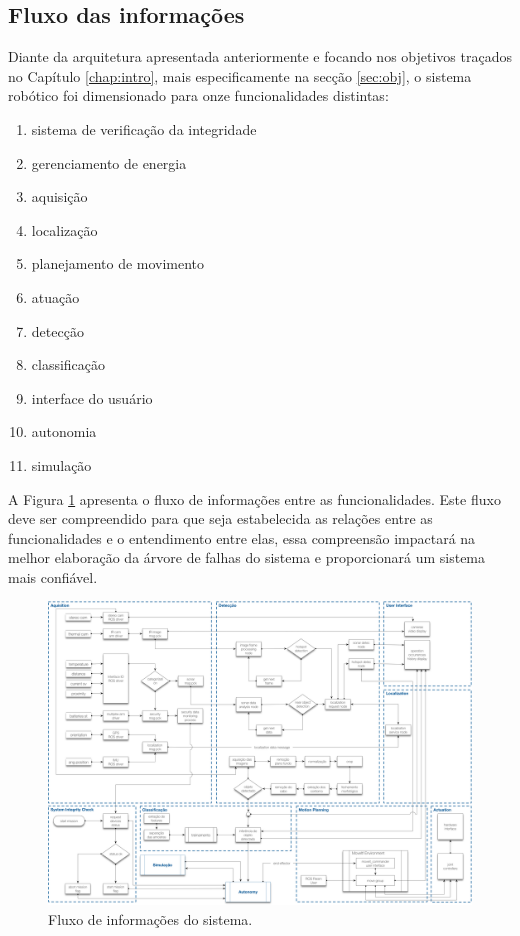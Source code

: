 \subsection{Fluxo das informações}
\label{ssec:fluxo}

Diante da arquitetura apresentada anteriormente e focando nos objetivos traçados no Capítulo \ref{chap:intro}, mais especificamente na secção \ref{sec:obj}, o sistema robótico foi dimensionado para onze funcionalidades distintas:

\begin{enumerate}%
	\item sistema de verificação da integridade
	\item gerenciamento de energia
	\item aquisição
	\item localização
	\item planejamento de movimento
	\item atuação
	\item detecção
	\item classificação
	\item interface do usuário
	\item autonomia
	\item simulação
\end{enumerate}

A Figura \ref{img:elirfluxo} apresenta o fluxo de informações entre as funcionalidades. Este fluxo deve ser compreendido para que seja estabelecida as relações entre as funcionalidades e o entendimento entre elas, essa compreensão impactará na melhor elaboração da árvore de falhas do sistema e proporcionará um sistema mais confiável.

\begin{figure} [h!]	
	\caption{Fluxo de informações do sistema.}
	\label{img:elirfluxo}											 
	\centering													 
	\includegraphics[width=1.0\textwidth]{Figures/flxinfofunctionalities}
\end{figure}													 

